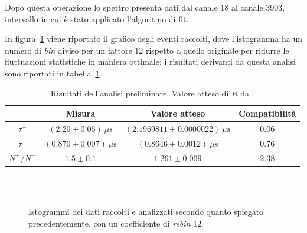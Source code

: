 \documentclass[10pt, oneside, a4paper]{article}   	%
\begin{document}
Dopo questa operazione lo spettro presenta dati dal canale 18 al canale 3903, intervallo in cui è stato applicato l'algoritmo di fit. 

In figura~\ref{fig::histo} viene riportato il grafico degli eventi raccolti, dove l'istogramma ha un numero di \emph{bin} diviso per un fattore 12 rispetto a quello originale per ridurre le fluttuazioni statistiche in maniera ottimale; i risultati derivanti da questa analisi sono riportati in tabella~\ref{results}.
%
\newpage
\begin{table}[p]
	\centering
	\begin{tabular}{cccc}
		\toprule
				& Misura	& Valore atteso 	& Compatibilità \\	
		\midrule
		$\tau^+$	& $(2.20 \pm 0.05) \ \mu \mbox{s}$ 	& $(2.1969811 \pm 0.0000022) \  \mu \mbox{s}$ 	& 0.06 	\\
		$\tau^-$	& $(0.870 \pm 0.007)  \ \mu \mbox{s}$ 	& $(0.8646 \pm 0.0012)  \ \mu \mbox{s}$ 		& 0.76	\\
		$N^+/N^-$	& $1.5 \pm 0.1$ 	& $1.261 \pm 0.009$ 		& 2.38	\\
		\bottomrule
	\end{tabular}
	\caption{Risultati dell'analisi preliminare. Valore atteso di $R$ da \cite{R}.}
	\label{results}
\end{table}
%
\begin{figure}[p]
\centering
{} \\
 \\
\caption{Istogrammi dei dati raccolti e analizzati secondo quanto spiegato precedentemente, con un coefficiente di \emph{rebin} 12.}
\label{fig::histo}
\end{figure}
\end{document}

